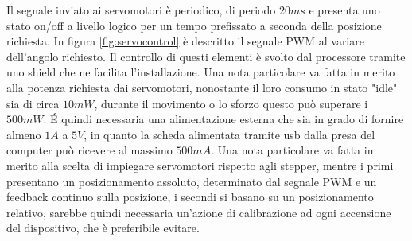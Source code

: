 \documentclass[12pt,twoside,openright]{article}
\begin{document}
Il segnale inviato ai servomotori è periodico, di periodo $20ms$ e presenta uno stato on/off a livello logico per un tempo prefissato a seconda della posizione richiesta. In figura \ref{fig:servocontrol} è descritto il segnale PWM al variare dell'angolo richiesto. 
Il controllo di questi elementi è svolto dal processore tramite uno shield che ne facilita l'installazione. Una nota particolare va fatta in merito alla potenza richiesta dai servomotori, nonostante il loro consumo in stato "idle" sia di circa $10mW$, durante il movimento o lo sforzo questo può superare i $500mW$. É quindi necessaria una alimentazione esterna che sia in grado di fornire almeno $1A$ a $5V$, in quanto la scheda alimentata tramite usb dalla presa del computer può ricevere al massimo $500mA$. Una nota particolare va fatta in merito alla scelta di impiegare servomotori rispetto agli stepper, mentre i primi presentano un posizionamento assoluto, determinato dal segnale PWM e un feedback continuo sulla posizione, i secondi si basano su un posizionamento relativo, sarebbe quindi necessaria un'azione di calibrazione ad ogni accensione del dispositivo, che è preferibile evitare.
\end{document}
